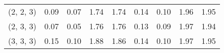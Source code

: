 \begin{tabular}{lrrrrrrrr}
(2, 2, 3)     &                                               0.09 &                                            0.07 &                            1.74 &                                  1.74 &                                               0.14 &                                            0.10 &                            1.96 &                                  1.95 \\
(2, 3, 3)     &                                               0.07 &                                            0.05 &                            1.76 &                                  1.76 &                                               0.13 &                                            0.09 &                            1.97 &                                  1.94 \\
(3, 3, 3)     &                                               0.15 &                                            0.10 &                            1.88 &                                  1.86 &                                               0.14 &                                            0.10 &                            1.97 &                                  1.95 \\
\bottomrule
\end{tabular}
